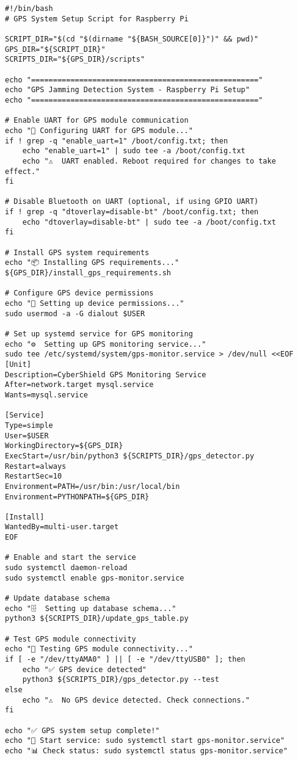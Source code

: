 \documentclass[12pt,a4paper]{report}
\begin{document}
\begin{lstlisting}[style=bashstyle, caption=GPS System Setup Script]
#!/bin/bash
# GPS System Setup Script for Raspberry Pi

SCRIPT_DIR="$(cd "$(dirname "${BASH_SOURCE[0]}")" && pwd)"
GPS_DIR="${SCRIPT_DIR}"
SCRIPTS_DIR="${GPS_DIR}/scripts"

echo "===================================================="
echo "GPS Jamming Detection System - Raspberry Pi Setup"
echo "===================================================="

# Enable UART for GPS module communication
echo "🔧 Configuring UART for GPS module..."
if ! grep -q "enable_uart=1" /boot/config.txt; then
    echo "enable_uart=1" | sudo tee -a /boot/config.txt
    echo "⚠️  UART enabled. Reboot required for changes to take effect."
fi

# Disable Bluetooth on UART (optional, if using GPIO UART)
if ! grep -q "dtoverlay=disable-bt" /boot/config.txt; then
    echo "dtoverlay=disable-bt" | sudo tee -a /boot/config.txt
fi

# Install GPS system requirements
echo "📦 Installing GPS requirements..."
${GPS_DIR}/install_gps_requirements.sh

# Configure GPS device permissions
echo "🔐 Setting up device permissions..."
sudo usermod -a -G dialout $USER

# Set up systemd service for GPS monitoring
echo "⚙️  Setting up GPS monitoring service..."
sudo tee /etc/systemd/system/gps-monitor.service > /dev/null <<EOF
[Unit]
Description=CyberShield GPS Monitoring Service
After=network.target mysql.service
Wants=mysql.service

[Service]
Type=simple
User=$USER
WorkingDirectory=${GPS_DIR}
ExecStart=/usr/bin/python3 ${SCRIPTS_DIR}/gps_detector.py
Restart=always
RestartSec=10
Environment=PATH=/usr/bin:/usr/local/bin
Environment=PYTHONPATH=${GPS_DIR}

[Install]
WantedBy=multi-user.target
EOF

# Enable and start the service
sudo systemctl daemon-reload
sudo systemctl enable gps-monitor.service

# Update database schema
echo "🗄️  Setting up database schema..."
python3 ${SCRIPTS_DIR}/update_gps_table.py

# Test GPS module connectivity
echo "🧪 Testing GPS module connectivity..."
if [ -e "/dev/ttyAMA0" ] || [ -e "/dev/ttyUSB0" ]; then
    echo "✅ GPS device detected"
    python3 ${SCRIPTS_DIR}/gps_detector.py --test
else
    echo "⚠️  No GPS device detected. Check connections."
fi

echo "✅ GPS system setup complete!"
echo "🔄 Start service: sudo systemctl start gps-monitor.service"
echo "📊 Check status: sudo systemctl status gps-monitor.service"
\end{lstlisting}
\end{document}
